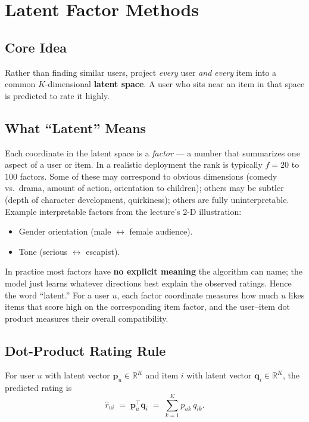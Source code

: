 \documentclass[11pt]{article}
\begin{document}
\section{Latent Factor Methods}
\label{sec:latent}

\subsection{Core Idea}
Rather than finding similar users, project \emph{every} user \emph{and} \emph{every} item into a common $K$-dimensional \textbf{latent space}. A user who sits near an item in that space is predicted to rate it highly.

\subsection{What ``Latent'' Means}
Each coordinate in the latent space is a \emph{factor} --- a number that summarizes one aspect of a user or item. In a realistic deployment the rank is typically $f = 20$ to $100$ factors. Some of these may correspond to obvious dimensions (comedy vs.\ drama, amount of action, orientation to children); others may be subtler (depth of character development, quirkiness); others are fully uninterpretable. Example interpretable factors from the lecture's 2-D illustration:
\begin{itemize}
    \item Gender orientation (male $\leftrightarrow$ female audience).
    \item Tone (serious $\leftrightarrow$ escapist).
\end{itemize}
In practice most factors have \textbf{no explicit meaning} the algorithm can name; the model just learns whatever directions best explain the observed ratings. Hence the word ``latent.'' For a user $u$, each factor coordinate measures how much $u$ likes items that score high on the corresponding item factor, and the user--item dot product measures their overall compatibility.

\subsection{Dot-Product Rating Rule}
For user $u$ with latent vector $\mathbf{p}_u \in \mathbb{R}^K$ and item $i$ with latent vector $\mathbf{q}_i \in \mathbb{R}^K$, the predicted rating is
\begin{equation}
    \hat{r}_{ui} \;=\; \mathbf{p}_u^{\top} \mathbf{q}_i \;=\; \sum_{k=1}^{K} p_{uk}\, q_{ik}.
\end{equation}
\end{document}
